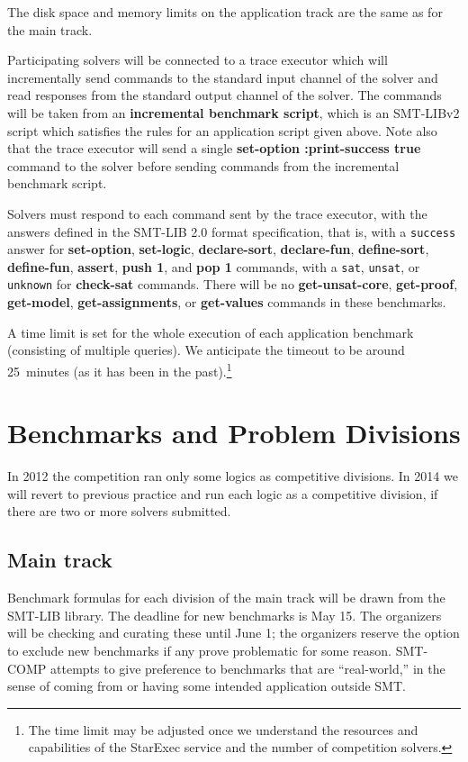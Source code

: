 \documentclass[12pt]{article}
\newcommand{\akey}[1]{\textbf{#1}}
\begin{document}
The disk space and memory limits on the application track are the same as for the main track.

Participating solvers will be connected to a trace executor 
which will incrementally send commands to the standard input channel of the solver
and read responses from the standard output channel of the solver.
The commands will be taken from an \textbf{incremental benchmark script},
which is an SMT-LIBv2 script which satisfies the rules for an application script given above.
Note also that the trace executor will send a single 
\akey{set-option :print-success true} command to the solver before 
sending commands from the incremental benchmark script.

\medskip
Solvers must respond to each command sent by the trace executor, 
with the answers defined in the SMT-LIB 2.0 format specification, that is,
with a \texttt{success} answer for 
\akey{set-option}, 
\akey{set-logic}, 
\akey{declare-sort}, 
\akey{declare-fun}, 
\akey{define-sort}, 
\akey{define-fun}, 
\akey{assert}, 
\akey{push 1}, 
and \akey{pop 1} 
commands,
 with a \texttt{sat}, \texttt{unsat}, or \texttt{unknown} 
for \akey{check-sat} commands. There will be no \akey{get-unsat-core}, \akey{get-proof}, \akey{get-model}, \akey{get-assignments}, or \akey{get-values} commands in these benchmarks.

A time limit is set for the whole execution of each application
benchmark (consisting of multiple queries).  We anticipate the
timeout to be around 25~minutes (as it has been in the past).\footnote{The time limit may be adjusted once we understand the resources and capabilities of the StarExec service and the number of competition solvers.}



\section{Benchmarks and Problem Divisions}
\label{sec:theories}

In 2012 the competition ran only some logics as competitive divisions.
In 2014 we will revert to previous practice and run each logic as a competitive division, if there are two or more solvers submitted.

\subsection{Main track}

Benchmark formulas for each division of the main track
will be drawn from the SMT-LIB library. The deadline for new benchmarks is
May 15. The organizers will be checking and curating these until June 1;
the organizers reserve the option to exclude new benchmarks if any prove problematic for some reason.
SMT-COMP
attempts to give preference to benchmarks that are ``real-world,'' in
the sense of coming from or having some intended application outside
SMT.
\end{document}
